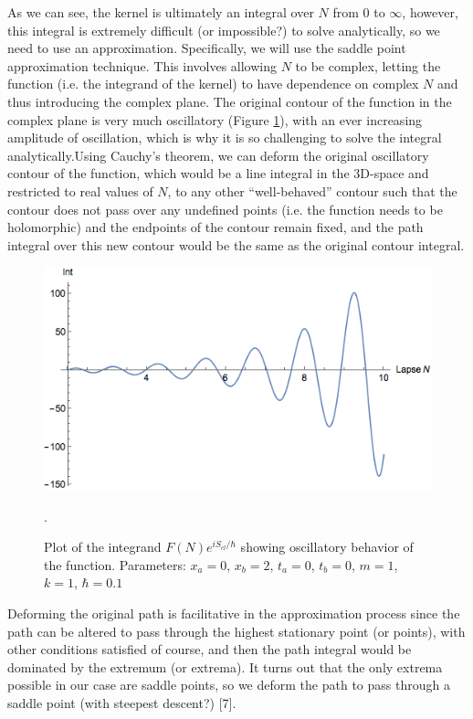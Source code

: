 \documentclass[12pt]{revtex4}
\begin{document}
As we can see, the kernel is ultimately an integral over $N$ from 0 to $\infty$, however, this integral is extremely difficult (or impossible?) to solve analytically, so we need to use an approximation. Specifically, we will use the saddle point approximation technique. This involves allowing $N$ to be complex, letting the function (i.e. the integrand of the kernel) to have dependence on complex $N$ and thus introducing the complex plane. The original contour of the function in the complex plane is very much oscillatory (Figure \ref{fig:intplot}), with an ever increasing amplitude of oscillation, which is why it is so challenging to solve the integral analytically.Using Cauchy's theorem, we can deform the original oscillatory contour of the function, which would be a line integral in the 3D-space and restricted to real values of $N$, to any other ``well-behaved'' contour such that the contour does not pass over any undefined points (i.e. the function needs to be holomorphic) and the endpoints of the contour remain fixed, and the path integral over this new contour would be the same as the original contour integral.

\begin{figure}[h]
	\centering
	\includegraphics[width=0.7\linewidth]{integrandplot}
	\caption{Plot of the integrand $F(N) e^{i S_{cl}/\hbar}$ showing oscillatory behavior of the function. Parameters: $x_a=0$, $x_b=2$, $t_a=0$, $t_b=0$, $m=1$, $k=1$, $\hbar=0.1$}.
	\label{fig:intplot}
\end{figure}
Deforming the original path is facilitative in the approximation process since the path can be altered to pass through the highest stationary point (or points), with other conditions satisfied of course, and then the path integral would be dominated by the extremum (or extrema). It turns out that the only extrema possible in our case are saddle points, so we deform the path to pass through a saddle point (with steepest descent?) [7].
\end{document}
